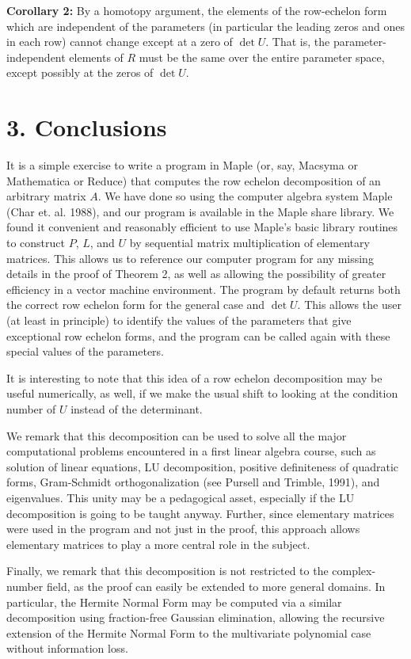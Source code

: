 {\bf Corollary 2:} By a homotopy argument, the elements of
the row-echelon form which are independent of the
parameters (in particular the leading zeros and ones in each
row) cannot change except at a zero of $\det U$.
That is, the parameter-independent elements of $R$ must be
the same over the entire parameter space, except possibly at
the zeros of $\det U$.

\section{3. Conclusions}
It is a simple exercise to write a program in Maple (or, say,
Macsyma or Mathematica or Reduce) that computes the row
echelon decomposition of an arbitrary matrix $A$.
We have done so
using the computer algebra system Maple (Char et. al.
1988), and our program is available in the Maple share library.
We found
it convenient and reasonably efficient to use Maple's basic
library routines to construct $P$, $L$, and $U$ by
sequential matrix multiplication of elementary matrices.  This
allows us to reference our computer program for any
missing details in the proof of Theorem 2, as well as allowing the
possibility of greater efficiency in a vector machine
environment.
The program by default returns both the correct row echelon form
for the general case and $\det U$.
This allows the user (at least in principle) to identify the values
of the parameters that give exceptional row echelon forms,
and the program can be called again with these special values
of the parameters.

It is interesting to note that this idea of a row echelon
decomposition may be useful numerically, as well, if we
make the usual shift to looking at the condition number of
$U$ instead of the determinant.

We remark that this decomposition can be used to solve all
the major computational problems encountered in a first
linear algebra course, such as solution of linear equations,
LU decomposition, positive definiteness of quadratic forms,
Gram-Schmidt orthogonalization (see Pursell and Trimble,
1991), and eigenvalues.
This unity may be a pedagogical asset, especially if the LU
decomposition is going to be taught anyway.
Further, since elementary matrices were used in the program and not
just in the proof, this approach allows elementary matrices to play a
more central role in the subject.

Finally, we remark that this decomposition is not restricted
to the complex-number field, as the proof can easily be
extended to more general domains.
In particular, the Hermite Normal Form may be computed
via a similar decomposition using fraction-free Gaussian
elimination, allowing the recursive extension of the Hermite
Normal Form to the multivariate polynomial case without
information loss.

